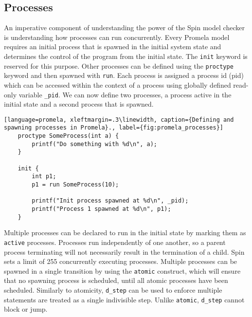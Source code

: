 \subsection{Processes}
An imperative component of understanding the power of the Spin model checker is understanding how processes can run concurrently. Every Promela model requires an initial process that is spawned in the initial system state and determines the control of the program from the initial state. The \texttt{init} keyword is reserved for this purpose. Other processes can be defined using the \texttt{proctype} keyword and then spawned with \texttt{run}. Each process is assigned a process id (pid) which can be accessed within the context of a process using globally defined read-only variable \texttt{\_pid}. We can now define two processes, a process active in the initial state and a second process that is spawned.
\begin{lstlisting}[language=promela, xleftmargin=.3\linewidth, caption={Defining and spawning processes in Promela}., label={fig:promela_processes}]
    proctype SomeProcess(int a) {
        printf("Do something with %d\n", a);
    }
    
    init {
        int p1;
        p1 = run SomeProcess(10);

        printf("Init process spawned at %d\n", _pid);
        printf("Process 1 spawned at %d\n", p1);
    }
\end{lstlisting}
Multiple processes can be declared to run in the initial state by marking them as \texttt{active} processes. Processes run independently of one another, so a parent process terminating will not necessarily result in the termination of a child. Spin sets a limit of 255 concurrently executing processes. Multiple processes can be spawned in a single transition by using the \texttt{atomic} construct, which will ensure that no spawning process is scheduled, until all atomic processes have been scheduled. Similarly to atomicity, \texttt{d\_step} can be used to enforce multiple statements are treated as a single indivisible step. Unlike \texttt{atomic}, \texttt{d\_step} cannot block or jump.

